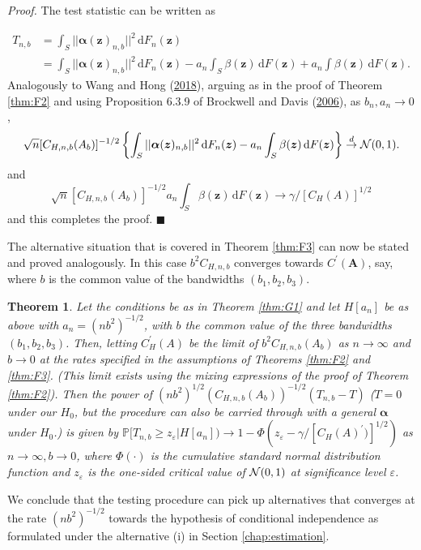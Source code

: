 \documentclass[
  12pt,
  letterpaper]{article}
\newtheorem{thm}{Theorem}[section]
\numberwithin{equation}{section}
\newcommand{\z}{\bm{z}}
\newcommand{\fA}{\bm{A}}
\newcommand{\falpha}{\bm{\alpha}}
\newcommand{\di}{\,\textrm{d}}
\begin{document}
\emph{Proof.} The test statistic can be written as

\begin{align*}
T_{n,b} & = \int_S ||{\falpha}(\z)_{n,b}||^2 \di F_n(\z) \\
&= \int _S ||{\falpha}(\z)_{n,b}||^2 \di F_n(\z) - a_n \int_S \beta(\z) \di F(\z) + a_n \int \beta(\z) \di F(\z).
\end{align*}
Analogously to Wang and Hong (\protect\hyperlink{ref-wang2017characteristic}{2018}), arguing as in the proof of Theorem \ref{thm:F2} and using Proposition 6.3.9 of Brockwell and Davis (\protect\hyperlink{ref-brockwell1991time}{2006}), as \(b_n, a_n \to 0\),
\[
\sqrt{n}[C_{H,n,b}(A_b)]^{-1/2}\left\{\int_S ||{\falpha}(\z)_{n,b}||^2 \di F_n(\z) - a_n \int_S \beta(\z) \di F(\z)\right\} \stackrel{d}{\to} {\cal N}(0,1).
\]
and
\[
\sqrt{n}[C_{H,n,b}(A_b)]^{-1/2} a_n \int_S \beta(\z) \di F(\z) \to \gamma/[C_H(A)]^{1/2}
\]
and this completes the proof. \(\blacksquare\)

The alternative situation that is covered in Theorem \ref{thm:F3} can now be stated and proved analogously. In this case \(b^2 C_{H,n,b}\) converges towards \(C^{\prime}(\fA)\), say, where \(b\) is the common value of the bandwidths \((b_1,b_2,b_3)\).

\begin{thm}
Let the conditions be as in Theorem \ref{thm:G1} and let $H[a_n]$ be as above with $a_n =(nb^2)^{-1/2}$, with $b$ the common value of the three bandwidths $(b_1,b_2,b_3)$. Then, letting $C_H^{\prime}(A)$ be the limit of $b^2C_{H,n,b}(A_b)$ as $n \to \infty$ and $b \to 0$ at the rates specified in the assumptions of Theorems \ref{thm:F2} and \ref{thm:F3}. (This limit exists using the mixing expressions of the proof of Theorem \ref{thm:F2}). Then the power of $(nb^2)^{1/2}(C_{H,n,b}(A_b))^{-1/2}(T_{n,b}-T)$ ($T = 0$ under our $H_0$, but the procedure can also be carried through with a general ${\falpha}$ under $H_0$.) is given by $\mathbb{P}[T_{n,b} \geq z_{\varepsilon}|H[a_n]) \to 1-\Phi(z_{\varepsilon}-\gamma/[C_{H}(A)^{\prime})]^{1/2})$ as $n \to \infty, b \to 0$, where $\Phi(\cdot)$ is the cumulative standard normal distribution function and $z_{\varepsilon}$ is the one-sided critical value of ${\cal N}(0,1)$ at significance level $\varepsilon$.
\label{thm:G2}
\end{thm}

We conclude that the testing procedure can pick up alternatives that converges at the rate \((nb^2)^{-1/2}\) towards the hypothesis of conditional independence as formulated under the alternative (i) in Section \ref{chap:estimation}.
\end{document}
